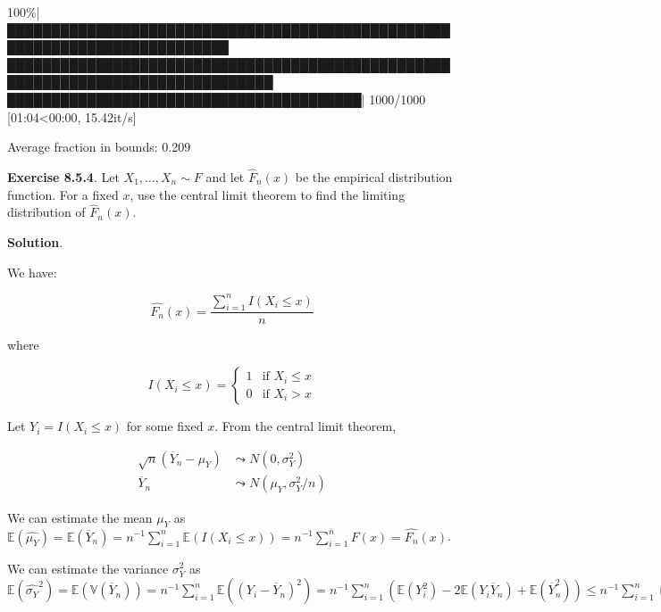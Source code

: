 \begin{console}
100\%|███████████████████████████████████████████████████████████████████████████
████████████████████████████████████████████████████████████████████████████████
████████████████████████████████████████| 1000/1000 [01:04<00:00, 15.42it/s]
\end{console}

\begin{console}
Average fraction in bounds: 0.209
\end{console}

\begin{console}

\end{console}

\textbf{Exercise 8.5.4}. Let \(X_1, \dots, X_n \sim F\) and let
\(\hat{F}_n(x)\) be the empirical distribution function. For a fixed
\(x\), use the central limit theorem to find the limiting distribution
of \(\hat{F}_n(x)\).

\textbf{Solution}.

We have:

\[
\hat{F_n}(x) = \frac{\sum_{i=1}^n I\left(X_i \leq x \right)}{n}
\]

where

\[
\begin{equation}
I\left(X_i \leq x\right) =
    \begin{cases}
      1   & \text{if } X_i \leq x \\
      0   & \text{if } X_i > x
    \end{cases}       
\end{equation}
\]

Let \(Y_i = I\left(X_i \leq x \right)\) for some fixed \(x\). From the
central limit theorem,

\begin{align}
\sqrt{n} (\overline{Y}_n - \mu_Y) & \leadsto N(0, \sigma_Y^2) \\
\overline{Y}_n & \leadsto N(\mu_Y, \sigma_Y^2 / n)
\end{align}

We can estimate the mean \(\mu_Y\) as
\(\mathbb{E}(\hat{\mu_Y}) = \mathbb{E}(\overline{Y}_n) = n^{-1} \sum_{i=1}^n \mathbb{E}(I(X_i \leq x)) = n^{-1} \sum_{i=1}^n F(x) = \hat{F_n}(x)\).

We can estimate the variance \(\sigma_Y^2\) as
\(\mathbb{E}(\hat{\sigma_Y}^2) = \mathbb{E}(\mathbb{V}(\overline{Y}_n)) = n^{-1} \sum_{i=1}^n \mathbb{E}((Y_i - \overline{Y}_n)^2) = n^{-1} \sum_{i=1}^n \left( \mathbb{E}(Y_i^2) - 2 \mathbb{E}(Y_i \overline{Y}_n) + \mathbb{E}(\overline{Y}_n^2) \right) \leq n^{-1} \sum_{i=1}^n \left( \mathbb{E}(Y_i) + \mathbb{E}(\overline{Y}_n^2) \right) \leq 2\)

